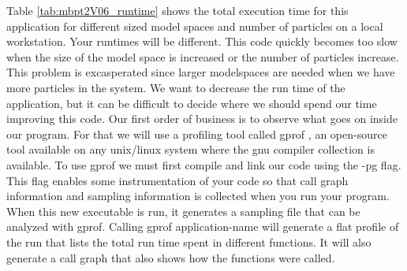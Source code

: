 Table \ref{tab:mbpt2V06_runtime} shows the total execution time for this
application for different sized model spaces and number of particles on a local
workstation. Your runtimes will be different. This code
quickly becomes too slow when the size of the model space is increased or the
number of particles increase. This problem is excasperated since larger
modelspaces are needed when we have more particles in the system.
We want to decrease the run time of the application, but it can be difficult to
decide where we should spend our time improving this code. Our first order of
business is to observe what goes on inside our program. For that we will use a
profiling tool called gprof \cite{refneeded}, an open-source tool available on any
unix/linux system where the gnu compiler collection is available. To use gprof
we must first compile and link our code using the -pg flag. This flag enables
some instrumentation of your code so that call graph information and sampling
information is collected when you run your program. When this new
executable is run, it generates a sampling file that can be analyzed with gprof.
Calling gprof application-name will generate a flat profile of the run that
lists the total run time spent in different functions. It will also generate a
call graph that also shows how the functions were called. 

